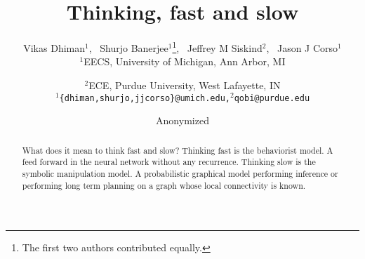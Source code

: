 \documentclass{article} %
\title{Thinking, fast and slow}
\author{Vikas Dhiman$^1$\footnotemark[1],%
  \, Shurjo Banerjee$^1$\thanks{The first two authors contributed equally.},%
  \, Jeffrey M Siskind$^2$,%
  \, Jason J Corso$^1$\\
$^1$EECS, University of Michigan,
Ann Arbor, MI
\and
$^2$ECE, Purdue University,
West Lafayette, IN\\
\texttt{$^1$\{dhiman,shurjo,jjcorso\}@umich.edu,$^2$qobi@purdue.edu} \\
}
\author{Anonymized}
\begin{document}
\maketitle
\begin{abstract}
  What does it mean to think fast and slow?
  Thinking fast is the behaviorist model. A feed forward in the neural
  network without any recurrence.
  Thinking slow is the symbolic manipulation model.
  A probabilistic graphical model performing inference or performing
  long term planning on a graph whose local connectivity is known.
\end{abstract}






{\small
{}

}
\end{document}
